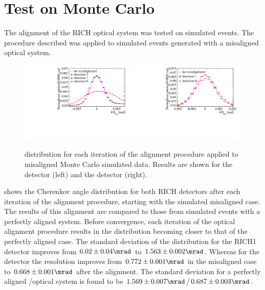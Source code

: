 \section{Test on Monte Carlo}
\label{sec:MCTrial}

The alignment of the \lhcb RICH optical system was tested on simulated events.
The procedure described was applied to simulated events generated with a
misaligned optical system. 
\begin{figure}[hbtp]
  \vspace*{-0.5\baselineskip}
  \centering
  \includegraphics[width=0.49\textwidth, height=0.35\textwidth]
                  {figs/Results/RICH1_Alignment_MC10.pdf}
  \includegraphics[width=0.49\textwidth, height=0.35\textwidth]
                  {figs/Results/RICH2_Alignment_MC10.pdf}
  \vspace*{-0.9\baselineskip}
  \caption{
    \deltatheta distribution for each iteration of the alignment procedure
    applied to misaligned Monte Carlo simulated data. Results are shown for the
    \richone detector (left) and the \richtwo  detector (right).}
  \label{fig:RICHMCTest}
  \vspace*{-0.5\baselineskip}
\end{figure}
shows the Cherenkov angle distribution for both RICH detectors after each
iteration of the alignment procedure, starting with the simulated misaligned
case. The results of this alignment are compared to those from simulated events
with a perfectly aligned system. Before convergence, each iteration of the
optical alignment procedure results in the distribution becoming closer to that
of the perfectly aligned case. The standard deviation of the \deltatheta
distribution for the RICH1 detector improves from $6.02\pm 0.04\mrad$ to
$1.563\pm 0.002\mrad$. Whereas for the \richtwo detector the resolution improves
from $0.772\pm 0.001\mrad$ in the misaligned case to  $0.668\pm 0.001\mrad$
after the alignment. The standard deviation for a perfectly aligned
\richone/\richtwo optical system is found to be  $1.569\pm
0.007\mrad$/$0.687\pm 0.003\mrad$.


